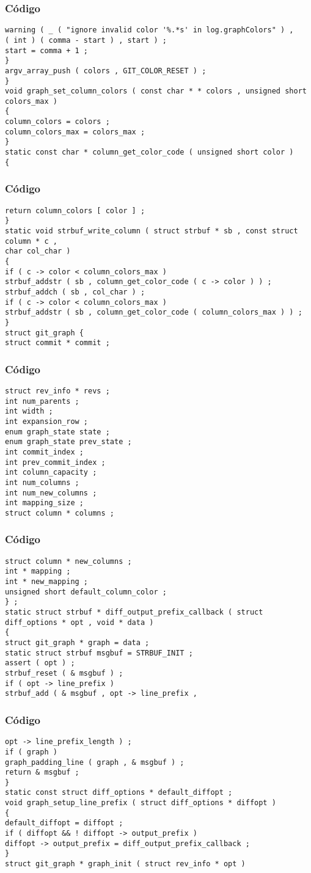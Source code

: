 \documentclass{beamer}
\begin{document}
\begin{frame}[fragile]
\frametitle{C\'odigo}
\begin{verbatim}
warning ( _ ( "ignore invalid color '%.*s' in log.graphColors" ) , 
( int ) ( comma - start ) , start ) ; 
start = comma + 1 ; 
} 
argv_array_push ( colors , GIT_COLOR_RESET ) ; 
} 
void graph_set_column_colors ( const char * * colors , unsigned short colors_max ) 
{ 
column_colors = colors ; 
column_colors_max = colors_max ; 
} 
static const char * column_get_color_code ( unsigned short color ) 
{ 
\end{verbatim}
\end{frame}
\begin{frame}[fragile]
\frametitle{C\'odigo}
\begin{verbatim}
return column_colors [ color ] ; 
} 
static void strbuf_write_column ( struct strbuf * sb , const struct column * c , 
char col_char ) 
{ 
if ( c -> color < column_colors_max ) 
strbuf_addstr ( sb , column_get_color_code ( c -> color ) ) ; 
strbuf_addch ( sb , col_char ) ; 
if ( c -> color < column_colors_max ) 
strbuf_addstr ( sb , column_get_color_code ( column_colors_max ) ) ; 
} 
struct git_graph { 
struct commit * commit ; 
\end{verbatim}
\end{frame}
\begin{frame}[fragile]
\frametitle{C\'odigo}
\begin{verbatim}
struct rev_info * revs ; 
int num_parents ; 
int width ; 
int expansion_row ; 
enum graph_state state ; 
enum graph_state prev_state ; 
int commit_index ; 
int prev_commit_index ; 
int column_capacity ; 
int num_columns ; 
int num_new_columns ; 
int mapping_size ; 
struct column * columns ; 
\end{verbatim}
\end{frame}
\begin{frame}[fragile]
\frametitle{C\'odigo}
\begin{verbatim}
struct column * new_columns ; 
int * mapping ; 
int * new_mapping ; 
unsigned short default_column_color ; 
} ; 
static struct strbuf * diff_output_prefix_callback ( struct diff_options * opt , void * data ) 
{ 
struct git_graph * graph = data ; 
static struct strbuf msgbuf = STRBUF_INIT ; 
assert ( opt ) ; 
strbuf_reset ( & msgbuf ) ; 
if ( opt -> line_prefix ) 
strbuf_add ( & msgbuf , opt -> line_prefix , 
\end{verbatim}
\end{frame}
\begin{frame}[fragile]
\frametitle{C\'odigo}
\begin{verbatim}
opt -> line_prefix_length ) ; 
if ( graph ) 
graph_padding_line ( graph , & msgbuf ) ; 
return & msgbuf ; 
} 
static const struct diff_options * default_diffopt ; 
void graph_setup_line_prefix ( struct diff_options * diffopt ) 
{ 
default_diffopt = diffopt ; 
if ( diffopt && ! diffopt -> output_prefix ) 
diffopt -> output_prefix = diff_output_prefix_callback ; 
} 
struct git_graph * graph_init ( struct rev_info * opt ) 
\end{verbatim}
\end{frame}
\end{document}
